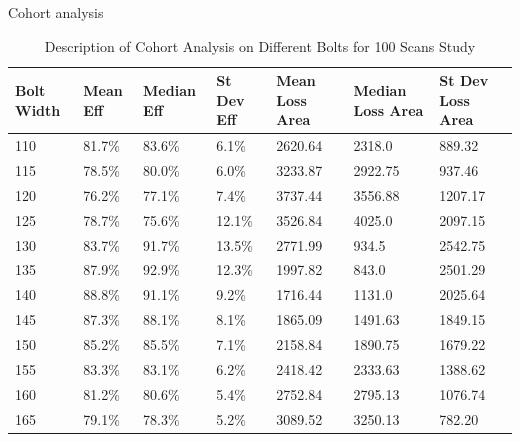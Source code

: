 Cohort analysis
\begin{table} [htb] %
    \centering %
    \begin{tabular}{p{2cm}|p{2cm}|p{2cm}|p{2cm}|p{2cm}|p{2cm}|p{2cm}} %
        \textbf{Bolt Width} & \textbf{Mean Eff} & \textbf{Median Eff} & \textbf{St Dev Eff} & \textbf{Mean Loss Area} & \textbf{Median Loss Area} & \textbf{St Dev Loss Area}\\
        \hline %
        110& 81.7\% & 83.6\% & 6.1\% & 2620.64 & 2318.0 & 889.32\\
        115& 78.5\% & 80.0\% & 6.0\% & 3233.87 & 2922.75 & 937.46\\
        120& 76.2\% & 77.1\% & 7.4\% & 3737.44 & 3556.88 & 1207.17\\
        125& 78.7\% & 75.6\% & 12.1\% & 3526.84 & 4025.0 & 2097.15\\
        130& 83.7\% & 91.7\% & 13.5\% & 2771.99 & 934.5 & 2542.75\\
        135& 87.9\% & 92.9\% & 12.3\% & 1997.82 & 843.0 & 2501.29\\
        140& 88.8\% & 91.1\% & 9.2\% & 1716.44 & 1131.0 & 2025.64\\
        145& 87.3\% & 88.1\% & 8.1\% & 1865.09 & 1491.63 & 1849.15\\
        150& 85.2\% & 85.5\% & 7.1\% & 2158.84 & 1890.75 & 1679.22\\
        155& 83.3\% & 83.1\% & 6.2\% & 2418.42 & 2333.63 & 1388.62\\
        160& 81.2\% & 80.6\% & 5.4\% & 2752.84 & 2795.13 & 1076.74\\
        165& 79.1\% & 78.3\% & 5.2\% & 3089.52 & 3250.13 & 782.20\\
        \end{tabular}
    \caption{Description of Cohort Analysis on Different Bolts for 100 Scans Study}
\end{table}

